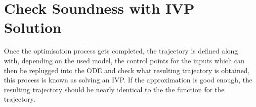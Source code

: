 \section{Check Soundness with IVP Solution}
\label{sec:ivproblem}

\par Once the optimisation process gets completed, the trajectory is defined along with, depending on the used model, the control points for the inputs which can then be replugged into the \ac{ODE} and check what resulting trajectory is obtained, this process is known as solving an \ac{IVP}. If the approximation is good enough, the resulting trajectory should be nearly identical to the the function for the trajectory. 

